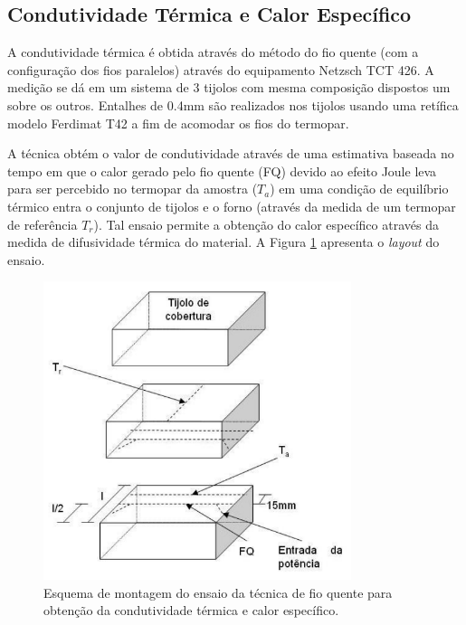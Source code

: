     \subsection{Condutividade Térmica e Calor Específico}\label{mat:condutividade}
    A condutividade térmica é obtida através do método do fio quente (com a
    configuração dos fios paralelos) através do
    equipamento Netzsch TCT 426. A medição se dá em um sistema de 3 tijolos com
    mesma composição dispostos um sobre os outros. Entalhes de 0.4mm são
    realizados nos tijolos usando uma retífica modelo Ferdimat T42 a fim de
    acomodar os fios do termopar.

    A técnica obtém o valor de condutividade através de uma estimativa baseada
    no tempo em que o calor gerado pelo fio quente (FQ) devido ao efeito Joule leva
    para ser percebido no termopar da amostra ($T_a$) em uma condição de equilíbrio
    térmico entra o conjunto de tijolos e o forno (através da medida de um
    termopar de referência $T_r$). Tal ensaio permite a obtenção do calor
    específico através da medida de difusividade térmica do material. A Figura \ref{fig:fio_quente}
    apresenta o {\it layout} do ensaio.

  \begin{figure}[ht]
	\centering
	\includegraphics[width=9cm]{./figures/fio_quente.pdf}
	\caption{Esquema de montagem do ensaio da técnica de fio quente para obtenção
    da condutividade térmica e calor específico.  \label{fig:fio_quente}}
  \end{figure}


    
